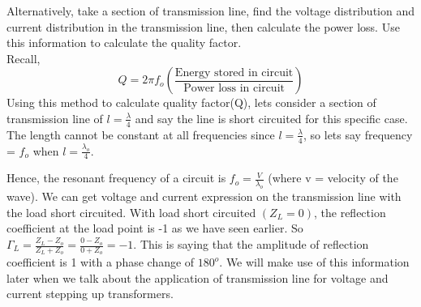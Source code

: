 Alternatively, take a section of transmission line, find the voltage distribution and current distribution in the transmission line, then calculate the power loss. Use this information to calculate the quality factor.\\
Recall,
\begin{equation}
Q=2\pi f_{o}\left(\frac{\text{Energy stored in circuit}}{\text{Power loss in circuit}}\right)
\end{equation}
Using this method to calculate quality factor(Q),
lets consider a section of transmission line of $ l=\frac{\lambda}{4} $ and say the line is short circuited for this specific case.\\
The length cannot be constant at all frequencies since $ l=\frac{\lambda}{4} $, so lets say frequency = $ f_{o} $ when $ l=\frac{\lambda_{o}}{4} $. 

Hence, the resonant frequency of a circuit is $ f_{o} =\frac{V}{\lambda_{o}}$ (where v = velocity of the wave). We can get voltage and current expression on the transmission line with the load short circuited. With load short circuited $(Z_{L}=0) $, the reflection coefficient at the load point is -1 as we have seen earlier. So $ \Gamma_{L} = \frac{Z_{L} - Z_{o}}{Z_{L} + Z_{o}} = \frac{0 - Z_{o}}{0 + Z_{o}} = -1 $. This is saying that the amplitude of reflection coefficient is 1 with a phase change of $ 180^{o} $. We will make use of this information later when we talk about the  application of transmission line for voltage and current stepping up transformers.

